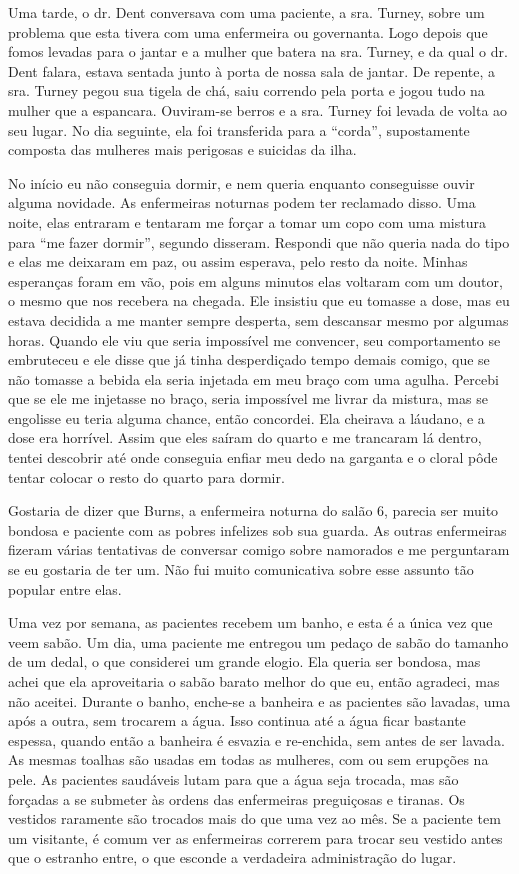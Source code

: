 Uma tarde, o dr. Dent conversava com uma paciente, a sra. Turney, sobre
um problema que esta tivera com uma enfermeira ou governanta. Logo
depois que fomos levadas para o jantar e a mulher que batera na sra.
Turney, e da qual o dr. Dent falara, estava sentada junto à porta de
nossa sala de jantar. De repente, a sra. Turney pegou sua tigela de chá,
saiu correndo pela porta e jogou tudo na mulher que a espancara.
Ouviram-se berros e a sra. Turney foi levada de volta ao seu lugar. No
dia seguinte, ela foi transferida para a ``corda'', supostamente
composta das mulheres mais perigosas e suicidas da ilha.

No início eu não conseguia dormir, e nem queria enquanto conseguisse
ouvir alguma novidade. As enfermeiras noturnas podem ter reclamado
disso. Uma noite, elas entraram e tentaram me forçar a tomar um copo com
uma mistura para ``me fazer dormir'', segundo disseram. Respondi que não
queria nada do tipo e elas me deixaram em paz, ou assim esperava, pelo
resto da noite. Minhas esperanças foram em vão, pois em alguns minutos
elas voltaram com um doutor, o mesmo que nos recebera na chegada. Ele
insistiu que eu tomasse a dose, mas eu estava decidida a me manter
sempre desperta, sem descansar mesmo por algumas horas. Quando ele viu
que seria impossível me convencer, seu comportamento se embruteceu e ele
disse que já tinha desperdiçado tempo demais comigo, que se não tomasse
a bebida ela seria injetada em meu braço com uma agulha. Percebi que se
ele me injetasse no braço, seria impossível me livrar da mistura, mas se
engolisse eu teria alguma chance, então concordei. Ela cheirava a
láudano, e a dose era horrível. Assim que eles saíram do quarto e me
trancaram lá dentro, tentei descobrir até onde conseguia enfiar meu dedo
na garganta e o cloral pôde tentar colocar o resto do quarto para
dormir.

Gostaria de dizer que Burns, a enfermeira noturna do salão 6, parecia
ser muito bondosa e paciente com as pobres infelizes sob sua guarda. As
outras enfermeiras fizeram várias tentativas de conversar comigo sobre
namorados e me perguntaram se eu gostaria de ter um. Não fui muito
comunicativa sobre esse assunto tão popular entre elas.

Uma vez por semana, as pacientes recebem um banho, e esta é a única vez
que veem sabão. Um dia, uma paciente me entregou um pedaço de sabão do
tamanho de um dedal, o que considerei um grande elogio. Ela queria ser
bondosa, mas achei que ela aproveitaria o sabão barato melhor do que eu,
então agradeci, mas não aceitei. Durante o banho, enche-se a banheira e
as pacientes são lavadas, uma após a outra, sem trocarem a água. Isso
continua até a água ficar bastante espessa, quando então a banheira é
esvazia e re-enchida, sem antes de ser lavada. As mesmas toalhas são
usadas em todas as mulheres, com ou sem erupções na pele. As pacientes
saudáveis lutam para que a água seja trocada, mas são forçadas a se
submeter às ordens das enfermeiras preguiçosas e tiranas. Os vestidos
raramente são trocados mais do que uma vez ao mês. Se a paciente tem um
visitante, é comum ver as enfermeiras correrem para trocar seu vestido
antes que o estranho entre, o que esconde a verdadeira administração do
lugar.

